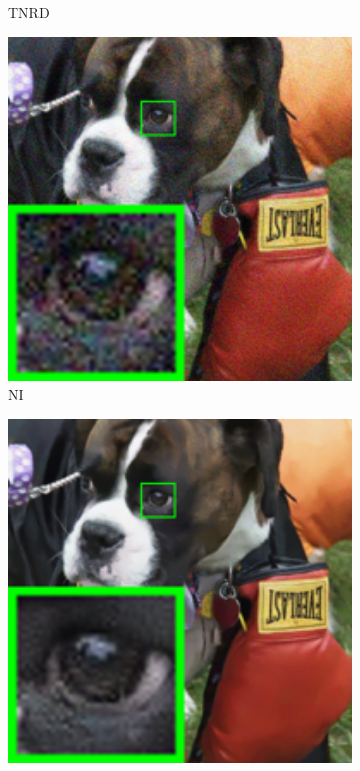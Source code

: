 \begin{figure}
\begin{subfigure}[t]{0.19\textwidth}
\caption{TNRD}
    \end{subfigure}
    \hfill
    \begin{subfigure}[t]{0.19\textwidth}
        \centering
        \includegraphics[width=1\textwidth]{images/mcwnnm/resize_br_NI_dog.png}
\caption{NI}
    \end{subfigure}
\hfill
    \begin{subfigure}[t]{0.19\textwidth}
        \centering
        \includegraphics[width=1\textwidth]{images/mcwnnm/resize_br_NC_dog.png}

\end{subfigure}
\end{figure}
